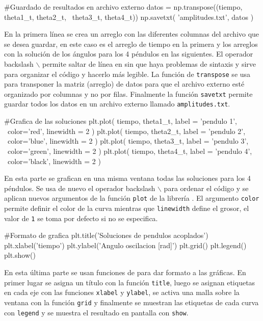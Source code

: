 \begin{listing}[style=python, numbers = none]
#Guardado de resultados en archivo externo
datos = np.transpose((tiempo, theta1_t, theta2_t, \
theta3_t, theta4_t))
np.savetxt( 'amplitudes.txt', datos )
\end{listing}
En la primera línea se crea un arreglo con las diferentes columnas del 
archivo que se desea guardar, en este caso es el arreglo de tiempo en la 
primera y los arreglos con la solución de los ángulos para los 4 péndulos
en las siguientes. El operador backslash $\backslash$ permite saltar de línea 
en \python sin que haya problemas de sintaxis y sirve para organizar el 
código y hacerlo más legible. La función de \numpy \texttt{transpose} se 
usa para transponer la matriz (arreglo) de datos para que el archivo 
externo esté organizado por columnas y no por filas. Finalmente la función
\texttt{savetxt} permite guardar todos los datos en un archivo externo 
llamado \texttt{amplitudes.txt}.


\begin{listing}[style=python, numbers = none]
#Grafica de las soluciones
plt.plot( tiempo, theta1_t, label = 'pendulo 1', \
color='red', linewidth = 2 )
plt.plot( tiempo, theta2_t, label = 'pendulo 2', \
color='blue', linewidth = 2 )
plt.plot( tiempo, theta3_t, label = 'pendulo 3', \
color='green', linewidth = 2 )
plt.plot( tiempo, theta4_t, label = 'pendulo 4', \
color='black', linewidth = 2 )
\end{listing}
En esta parte se grafican en una misma ventana todas las soluciones para 
los 4 péndulos. Se usa de nuevo el operador backslash $\backslash$ para
ordenar el código y se aplican nuevos argumentos de la función 
\texttt{plot} de la librería \matplotlib. El argumento \texttt{color} 
permite definir el color de la curva mientras que \texttt{linewidth}
define el grosor, el valor de \texttt{1} se toma por defecto si no se 
especifica.


\begin{listing}[style=python, numbers = none]
#Formato de grafica
plt.title('Soluciones de pendulos acoplados')
plt.xlabel('tiempo')
plt.ylabel('Angulo oscilacion [rad]')
plt.grid()
plt.legend()
plt.show()
\end{listing}
\newpage
En esta última parte se usan funciones de \matplotlib para dar formato a 
las gráficas. En primer lugar se asigna un título con la función 
\texttt{title}, luego se asignan etiquetas en cada eje con las funciones 
\texttt{xlabel} y \texttt{ylabel}, se activa una malla sobre la ventana 
con la función \texttt{grid} y finalmente se muestran las etiquetas de 
cada curva con \texttt{legend} y se muestra el resultado en pantalla con
\texttt{show}.

